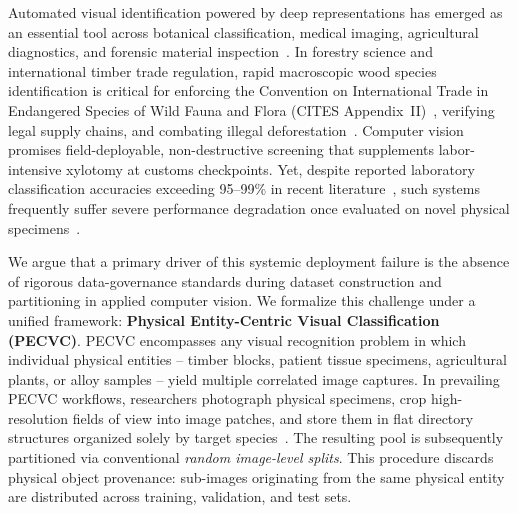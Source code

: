 \documentclass[a4paper,fleqn]{cas-sc}
\begin{document}
Automated visual identification powered by deep representations has emerged as an essential tool across botanical classification, medical imaging, agricultural diagnostics, and forensic material inspection~\cite{woodreview,rosadasilva2022,varoquaux2022,roberts2021}. In forestry science and international timber trade regulation, rapid macroscopic wood species identification is critical for enforcing the Convention on International Trade in Endangered Species of Wild Fauna and Flora (CITES Appendix~II)~\cite{cites}, verifying legal supply chains, and combating illegal deforestation~\cite{dormontt2015,song2025,liu2025}. Computer vision promises field-deployable, non-destructive screening that supplements labor-intensive xylotomy at customs checkpoints. Yet, despite reported laboratory classification accuracies exceeding 95--99\% in recent literature~\cite{song2025,fabijanska2021,wu2021}, such systems frequently suffer severe performance degradation once evaluated on novel physical specimens~\cite{ravindran2019,ravindran2020,ravindran2021,ravindran2022}.

We argue that a primary driver of this systemic deployment failure is the absence of rigorous data-governance standards during dataset construction and partitioning in applied computer vision. We formalize this challenge under a unified framework: \textbf{Physical Entity-Centric Visual Classification (PECVC)}. PECVC encompasses any visual recognition problem in which individual physical entities -- timber blocks, patient tissue specimens, agricultural plants, or alloy samples -- yield multiple correlated image captures. In prevailing PECVC workflows, researchers photograph physical specimens, crop high-resolution fields of view into image patches, and store them in flat directory structures organized solely by target species~\cite{east2025}. The resulting pool is subsequently partitioned via conventional \emph{random image-level splits}. This procedure discards physical object provenance: sub-images originating from the same physical entity are distributed across training, validation, and test sets.
\end{document}
